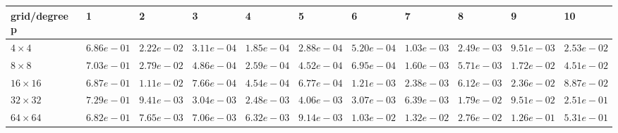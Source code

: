 \begin{tabular}{lllllllllll}
\hline
 grid/degree p   & 1          & 2          & 3          & 4          & 5          & 6          & 7          & 8          & 9          & 10         \\
\hline
 $4 \times 4$    & $6.86e-01$ & $2.22e-02$ & $3.11e-04$ & $1.85e-04$ & $2.88e-04$ & $5.20e-04$ & $1.03e-03$ & $2.49e-03$ & $9.51e-03$ & $2.53e-02$ \\
 $8 \times 8$    & $7.03e-01$ & $2.79e-02$ & $4.86e-04$ & $2.59e-04$ & $4.52e-04$ & $6.95e-04$ & $1.60e-03$ & $5.71e-03$ & $1.72e-02$ & $4.51e-02$ \\
 $16 \times 16$  & $6.87e-01$ & $1.11e-02$ & $7.66e-04$ & $4.54e-04$ & $6.77e-04$ & $1.21e-03$ & $2.38e-03$ & $6.12e-03$ & $2.36e-02$ & $8.87e-02$ \\
 $32 \times 32$  & $7.29e-01$ & $9.41e-03$ & $3.04e-03$ & $2.48e-03$ & $4.06e-03$ & $3.07e-03$ & $6.39e-03$ & $1.79e-02$ & $9.51e-02$ & $2.51e-01$ \\
 $64 \times 64$  & $6.82e-01$ & $7.65e-03$ & $7.06e-03$ & $6.32e-03$ & $9.14e-03$ & $1.03e-02$ & $1.32e-02$ & $2.76e-02$ & $1.26e-01$ & $5.31e-01$ \\
\hline
\end{tabular}
